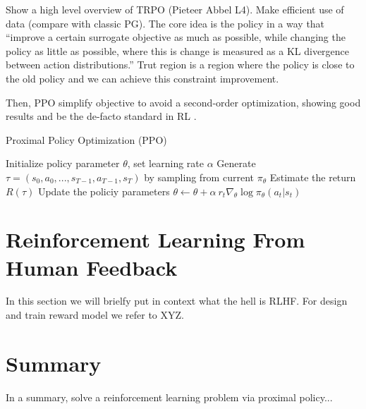 Show a high level overview of TRPO (Pieteer Abbel L4). Make efficient use of data (compare with classic PG). The core idea is the policy in a way that ``improve a certain surrogate objective as much as possible, while changing the policy as little as possible, where this is change is measured as a KL divergence between action distributions.'' Trut region 
is a region where the policy is close to the old policy and we can achieve this constraint improvement.

Then, PPO simplify objective to avoid a second-order optimization, showing
good results and be the de-facto standard in RL \cite{dlr191986}. 


\begin{algorithm}
    \caption{Proximal Policy Optimization (PPO)}
    \begin{algorithmic}
    \STATE Initialize policy parameter $\theta$, set learning rate $\alpha$
    \STATE Generate $\tau=(s_0, a_0, ..., s_{T-1}, a_{T-1}, s_{T})$ by sampling from current $\pi_{\theta}$
        \STATE Estimate the return $R(\tau)$
        \STATE Update the policiy parameters $\theta \leftarrow \theta + \alpha~r_{t}\nabla_{\theta}\log\pi_{\theta}(a_{t}|s_{t})$
    \ENDFOR
    \end{algorithmic}
\end{algorithm}



\section{Reinforcement Learning From Human Feedback}

In this section we will brielfy put in context what the hell is RLHF.
For design and train reward model we refer to XYZ.


\section{Summary}

In a summary, solve a reinforcement learning problem
via proximal policy...